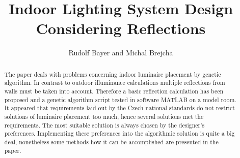 \documentclass[Afour,sagev,times,doublespace]{sagej}
\begin{document}

\title{Indoor Lighting System Design Considering Reflections}

\author{Rudolf Bayer and Michal Brejcha}




\begin{abstract}
The paper deals with problems concerning indoor luminaire placement by genetic algorithm. In contrast to outdoor illuminance calculations multiple reflections from walls must be taken into account. Therefore a basic reflection calculation has been proposed and a genetic algorithm script tested in software MATLAB on a model room. It appeared that requirements laid out by the Czech national standards do not restrict solutions of luminaire placement too much, hence several solutions met the requirements. The most suitable solution is always chosen by the designer's preferences. Implementing these preferences into the algorithmic solution is quite a big deal, nonetheless some methods how it can be accomplished are presented in the paper.
\end{abstract}


\maketitle









\end{document}
